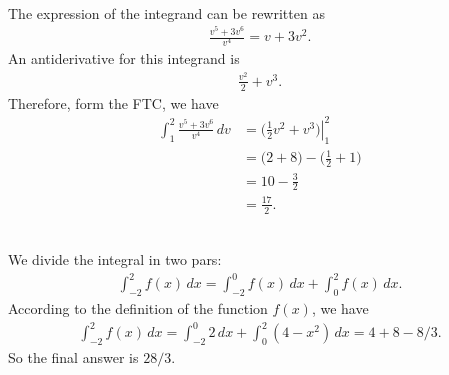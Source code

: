 	\spc
		
	\\
	The expression of the integrand can be rewritten as
		\begin{align*}
		\frac{v^5 + 3v^6}{v^4} = v + 3v^2 .
		\end{align*}
	An antiderivative for this integrand is
		\begin{align*}
		\frac{v^2}{2} + v^3 .
		\end{align*}
	Therefore, form the FTC, we have
		\begin{align*}
		\int_1^2 \frac{v^5 + 3v^6}{v^4} \, dv &= \left. \big( \tfrac{1}{2} v^2 + v^3 \big) \right|_{1}^2 \\
		&= \big( 2 + 8 \big) - \big( \tfrac{1}{2} + 1 \big) \\
		&= 10 - \tfrac{3}{2} \\
		&= \tfrac{17}{2} .
		\end{align*}
		
	\spc
	
	\\
	We divide the integral in two pars:
		\begin{align*}
		\int_{-2}^2 f(x) \, dx = \int_{-2}^0 f(x) \, dx  + \int_0^2 f(x) \, dx .
		\end{align*}
	According to the definition of the function $f(x)$, we have
		\begin{align*}
		\int_{-2}^2 f(x) \, dx = \int_{-2}^0 2 \, dx + \int_0^2 (4 - x^2) \, dx = 4 + 8 - 8/3 .
		\end{align*}
	So the final answer is $28/3$.
	
	\spc
		
